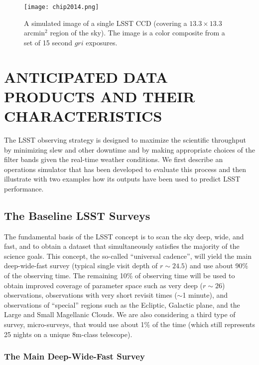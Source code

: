 \documentclass{emulateapj}
\begin{document}
\begin{figure}
\vskip -1in
\texttt{[image: chip2014.png]}
\vskip -1in
\caption{ A simulated image of a single LSST CCD (covering a
  $13.3\times13.3$ arcmin$^2$ region of the sky). The image is a color
  composite from a set of 15 second $gri$ exposures.}
\label{Fig:ImSimExample}
\end{figure}



\section{    ANTICIPATED DATA PRODUCTS AND THEIR CHARACTERISTICS    }
\label{Sec:dataprod}

The LSST observing strategy is designed to maximize the scientific
throughput by minimizing slew and other downtime and by making appropriate
choices of the filter bands given the real-time weather conditions. We first
describe an operations simulator that has been developed to evaluate this process and then
illustrate with two examples how its outputs have been used to predict LSST
performance. 


\subsection{ The Baseline LSST Surveys }

The fundamental basis of the LSST concept is to scan the sky deep, wide, and
fast, and to obtain a dataset that simultaneously satisfies the majority
of the science goals. This concept, the so-called ``universal cadence'', will
yield the main deep-wide-fast survey (typical single visit depth of $r\sim24.5$)
and use about 90\% of the observing time. The remaining 10\% of observing 
time will be used to obtain improved coverage of parameter space such as 
very deep ($r\sim26$) observations, observations with very short revisit 
times ($\sim$1 minute), and observations of ``special'' regions such as the 
Ecliptic, Galactic plane, and the Large and Small Magellanic Clouds. 
We are also considering a third type of survey, micro-surveys, that would 
use about 1\% of the time (which still represents 25 nights on a unique 
8m-class telescope). 

\subsubsection{ The Main Deep-Wide-Fast Survey }
\end{document}
